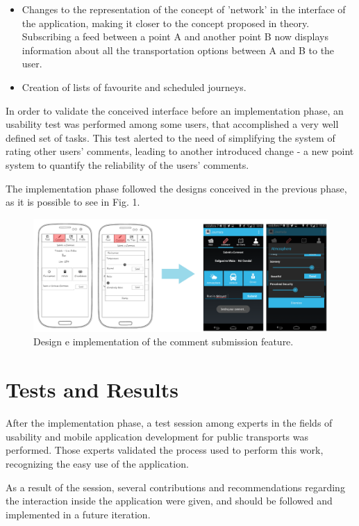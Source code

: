 \documentclass[9pt,a4paper]{extarticle}
\begin{document}
\begin{multicols}{2}
\begin{itemize}
\item Changes to the representation of the concept of 'network' in the interface of the application, making it closer to the concept proposed in theory. Subscribing a feed between a point A and another point B now displays information about all the transportation options between A and B to the user.

\item Creation of lists of favourite and scheduled journeys.

\end{itemize}

In order to validate the conceived interface before an implementation phase, an usability test was performed among some users, that accomplished a very well defined set of tasks. This test alerted to the need of simplifying the system of rating other users' comments, leading to another introduced change - a new point system to quantify the reliability of the users' comments.

The implementation phase followed the designs conceived in the previous phase, as it is possible to see in Fig. 1.

\begin{figure}[H]
\centerline{\includegraphics[scale=.15]{artigo.png}}
\caption{Design e implementation of the comment submission feature.}  
\label{fig:figura}
\end{figure}


\section{Tests and Results}

After the implementation phase, a test session among experts in the fields of usability and mobile application development for public transports was performed. Those experts validated the process used to perform this work, recognizing the easy use of the application.

As a result of the session, several contributions and recommendations regarding the interaction inside the application were given, and should be followed and implemented in a future iteration.


\end{multicols}
\end{document}
